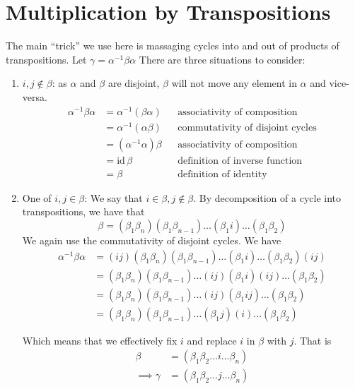 \documentclass[12pt]{article}
\begin{document}
\section{Multiplication by Transpositions}
The main ``trick'' we use here is massaging cycles into and out of products of transpositions.
Let $\gamma = \alpha^{-1} \beta \alpha$ There are three situations to consider:
\begin{enumerate}
\item $i, j \notin \beta$: as $\alpha$ and $\beta$ are disjoint, $\beta$ will not move any element in $\alpha$ and vice-versa.
\begin{align*}
\alpha^{-1} \beta \alpha &= \alpha^{-1}(\beta \alpha) & & \text{associativity of composition}\\
&= \alpha^{-1}(\alpha \beta) & & \text{commutativity of disjoint cycles}\\
&= (\alpha^{-1}\alpha)\beta & & \text{associativity of composition}\\
&= \mathrm{id} \, \beta & & \text{definition of inverse function}\\
&= \beta & & \text{definition of identity}
\end{align*}

\item One of $i,j \in \beta$: We say that $i \in \beta, j \notin \beta$. By decomposition of a cycle into transpositions, we have that 
\[
\beta = (\beta_1 \beta_n)(\beta_1 \beta_{n - 1})\ldots(\beta_1 i)\ldots(\beta_1 \beta_2)
\]
We again use the commutativity of disjoint cycles. We have
\begin{align*}
\alpha^{-1}\beta \alpha &= (ij)(\beta_1 \beta_n)(\beta_1 \beta_{n - 1})\ldots(\beta_1 i)\ldots(\beta_1 \beta_2)(ij)\\
&= (\beta_1 \beta_n)(\beta_1 \beta_{n - 1})\ldots(ij)(\beta_1 i)(ij)\ldots(\beta_1 \beta_2)\\
&= (\beta_1 \beta_n)(\beta_1 \beta_{n - 1})\ldots (ij) (\beta_1 i j)  \ldots(\beta_1 \beta_2)\\
&= (\beta_1 \beta_n)(\beta_1 \beta_{n - 1})\ldots (\beta_1 j)(i)  \ldots(\beta_1 \beta_2)
\end{align*}

Which means that we effectively fix $i$ and replace $i$ in $\beta$ with $j$. That is
\begin{align*}
\beta &= (\beta_1 \beta_2 \ldots i\ldots \beta_n)\\
\implies \gamma &= (\beta_1 \beta_2 \ldots j\ldots \beta_n)
\end{align*}


\end{enumerate}
\end{document}
